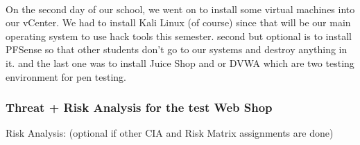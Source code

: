 \documentclass[12pt, letterpaper]{article}
\begin{document}
\hfill
\\
On the second day of our school, we went on to install some virtual machines into our vCenter. We had to install Kali Linux (of course) since that will be our main operating system to use hack tools this semester. second but optional is to install PFSense so that other students don't go to our systems and destroy anything in it. and the last one was to install Juice Shop and or DVWA which are two testing environment for pen testing.
\newpage
\subsubsection{Threat + Risk Analysis for the test Web Shop}

Risk Analysis: (optional if other CIA and Risk Matrix assignments are done)
\end{document}
